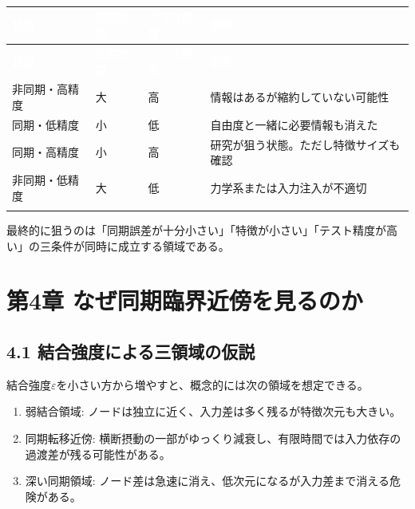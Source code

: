 \documentclass[11pt,a4paper]{ltjsarticle}
\renewcommand{\arraystretch}{1.25}
\begin{document}
\begingroup
\small
\renewcommand{\arraystretch}{1.35}
\begin{longtable}{@{}>{\raggedright\arraybackslash}p{}>{\raggedright\arraybackslash}p{}>{\raggedright\arraybackslash}p{}>{\raggedright\arraybackslash}p{}@{}}
\rowcolor{researchink}
\textcolor{white}{\textbf{状態}} & \textcolor{white}{\textbf{同期誤差}} & \textcolor{white}{\textbf{クラス精度}} & \textcolor{white}{\textbf{解釈}} \\
\endfirsthead
\rowcolor{researchink}
\textcolor{white}{\textbf{状態}} & \textcolor{white}{\textbf{同期誤差}} & \textcolor{white}{\textbf{クラス精度}} & \textcolor{white}{\textbf{解釈}} \\
\endhead
非同期・高精度 & 大 & 高 & 情報はあるが縮約していない可能性 \\
\addlinespace[2pt]
\rowcolor{researchpale}
同期・低精度 & 小 & 低 & 自由度と一緒に必要情報も消えた \\
\addlinespace[2pt]
同期・高精度 & 小 & 高 & 研究が狙う状態。ただし特徴サイズも確認 \\
\addlinespace[2pt]
\rowcolor{researchpale}
非同期・低精度 & 大 & 低 & 力学系または入力注入が不適切 \\
\addlinespace[2pt]
\end{longtable}
\endgroup

最終的に狙うのは「同期誤差が十分小さい」「特徴が小さい」「テスト精度が高い」の三条件が同時に成立する領域である。\par

\goodbreak

\section*{\textcolor{researchink}{第4章 なぜ同期臨界近傍を見るのか}}


\subsection*{\textcolor{researchblue}{4.1 結合強度による三領域の仮説}}

結合強度\(\varepsilon\)を小さい方から増やすと、概念的には次の領域を想定できる。\par

\begin{enumerate}

\item 弱結合領域: ノードは独立に近く、入力差は多く残るが特徴次元も大きい。

\item 同期転移近傍: 横断摂動の一部がゆっくり減衰し、有限時間では入力依存の過渡差が残る可能性がある。

\item 深い同期領域: ノード差は急速に消え、低次元になるが入力差まで消える危険がある。

\end{enumerate}
\end{document}

